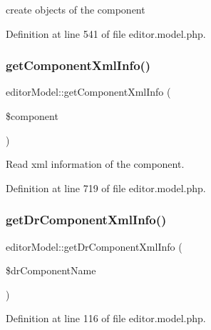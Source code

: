 create objects of the component 



Definition at line 541 of file editor.\+model.\+php.

\hypertarget{classeditorModel_ade91abf13956321e293195f2f14b4e2b}{}\label{classeditorModel_ade91abf13956321e293195f2f14b4e2b} 
\subsubsection{\texorpdfstring{get\+Component\+Xml\+Info()}{getComponentXmlInfo()}}
{\footnotesize\ttfamily editor\+Model\+::get\+Component\+Xml\+Info (\begin{DoxyParamCaption}\item[{}]{\$component }\end{DoxyParamCaption})}



Read xml information of the component. 



Definition at line 719 of file editor.\+model.\+php.

\hypertarget{classeditorModel_a580e31ed0fff869a97d5fe598975e960}{}\label{classeditorModel_a580e31ed0fff869a97d5fe598975e960} 
\subsubsection{\texorpdfstring{get\+Dr\+Component\+Xml\+Info()}{getDrComponentXmlInfo()}}
{\footnotesize\ttfamily editor\+Model\+::get\+Dr\+Component\+Xml\+Info (\begin{DoxyParamCaption}\item[{}]{\$dr\+Component\+Name }\end{DoxyParamCaption})}



Definition at line 116 of file editor.\+model.\+php.

\hypertarget{classeditorModel_a77477c0a6d333b3230f77904d96d93c5}{}\label{classeditorModel_a77477c0a6d333b3230f77904d96d93c5} 
